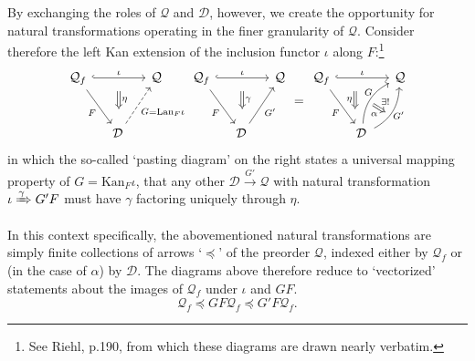 \documentclass{article}
\newcommand{\D}{\ensuremath{\mathcal{D}}}
\newcommand{\Q}{\ensuremath{\mathcal{Q}}}
\begin{document}
By exchanging the roles of $\Q$ and $\D$, however, we create the opportunity for natural transformations operating in the finer granularity of $\Q$.  Consider therefore the left Kan extension of the inclusion functor $\iota$ along $F$:\footnote{See Riehl, p.190, from which these diagrams are drawn nearly verbatim.}
\begin{equation}\label{Kan-yup}
  \begin{tikzcd}[row sep=large,column sep=small]
    \Q_f \ar[dr,"F"'] \ar[rr,hook,"\iota",""{name=U,below}] & & \Q \\
    & \D\, \ar[ur,dashed,"G=\text{Lan}_F \iota"']
      \ar[Rightarrow,shorten <=2mm,shorten >=4mm,from=U,"\eta"{pos=0.4}]
  \end{tikzcd}
  \begin{tikzcd}[row sep=large,column sep=small]
    \Q_f \ar[dr,"F"'] \ar[rr,hook,"\iota",""{name=U,below}] & & \Q \\
    & \D\, \ar[ur,"G'"']
      \ar[Rightarrow,shorten <=2mm,shorten >=4mm,from=U,"\gamma"{pos=0.4}]
  \end{tikzcd}
  =
  \begin{tikzcd}[row sep=large,column sep=small]
    \Q_f \ar[dr,"F"'] \ar[rr,hook,"\iota",""{name=U,below}] & & \Q \\
    & \D\, \ar[ur,bend left,"G"{pos=0.6,inner sep=0.2},""{name=H,below}]
           \ar[ur,bend right,"G'"'{inner sep=0},""{pos=0.35,name=I,above}]
           \ar[Rightarrow,from=H,to=I,"\exists !"{pos=0.4},"\alpha"'{pos=0.6}]
    \ar[Rightarrow,shorten <=2mm,shorten >=4mm,from=U,shift right=2mm,"\eta"'{pos=0.4}]
  \end{tikzcd}
\end{equation}
in which the so-called `pasting diagram' on the right states a universal mapping property of $G = \text{Kan}_F\iota$, that any other $\D \xrightarrow{G'} \Q$ with natural transformation $\iota \xRightarrow{\gamma} G'F$ must have $\gamma$ factoring uniquely through $\eta$.

In this context specifically, the abovementioned natural transformations are simply finite collections of arrows `$\preceq$' of the preorder $\Q$, indexed either by $\Q_f$ or (in the case of $\alpha$) by $\D$.  The diagrams above therefore reduce to `vectorized' statements about the images of $\Q_f$ under $\iota$ and $G F$.
\begin{equation}\label{Kan-vectorized}
  \Q_f \preceq G F \Q_f \preceq G' F \Q_f.
\end{equation}
\end{document}
